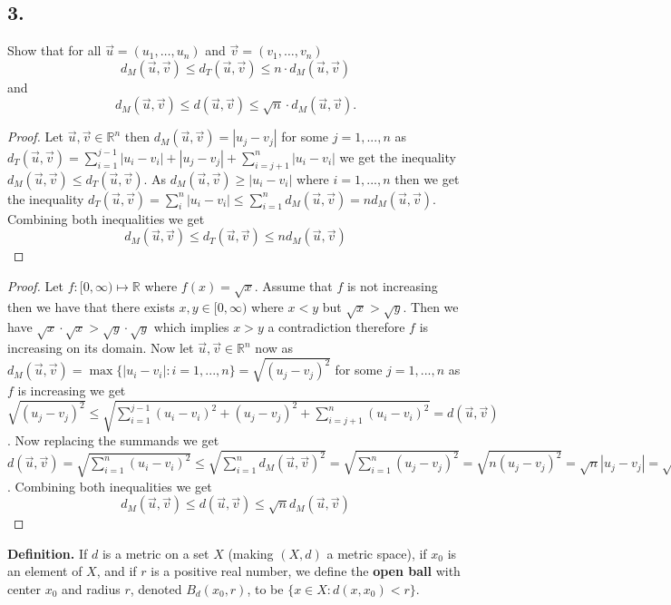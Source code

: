 \documentclass{amsart}
\theoremstyle{plain}
\theoremstyle{definition}
\theoremstyle{remark}
\begin{document}
\noindent
\subsection*{3.}  Show that for all $\vec{u} = (u_1, \ldots , u_n)$ and $\vec{v} = (v_1, \ldots , v_n )$
\[
    d_M (\vec{u} , \vec{v} ) \le d_T (\vec{u} , \vec{v} ) \le n\cdot d_M (\vec{u} , \vec{v} )
\]
and
\[
    d_M (\vec{u} , \vec{v} ) \le d (\vec{u} , \vec{v} ) \le \sqrt{n}\cdot d_M (\vec{u} , \vec{v} ).
\]

\vspace{.15in}


\begin{proof}

    Let $\vec{u},\vec{v}\in \mathbb{R}^n$ then $d_M(\vec{u},\vec{v})=|u_j-v_j|$ for some $j=1,...,n$ as $d_T(\vec{u},\vec{v})=\sum_{i=1}^{j-1}|u_i-v_i|+|u_j-v_j|+\sum_{i=j+1}^{n}|u_i-v_i|$ we get the inequality $d_M(\vec{u},\vec{v})\leq d_T(\vec{u},\vec{v})$. As $d_M(\vec{u},\vec{v})\geq |u_i-v_i|$ where $i=1,...,n$ then we get the inequality $d_T(\vec{u},\vec{v})=\sum_{i}^{n}|u_i-v_i|\leq \sum_{i=1}^{n}d_M(\vec{u},\vec{v})=nd_M(\vec{u},\vec{v})$.
    Combining both inequalities we get $$d_M(\vec{u},\vec{v})\leq d_T(\vec{u},\vec{v})\leq nd_M(\vec{u},\vec{v})$$
\end{proof}

\begin{proof}
    Let $f:[0,\infty)\mapsto \mathbb{R}$ where $f(x)=\sqrt{x}$. Assume that $f$ is not increasing then we have that there exists $x,y\in [0,\infty)$ where $x<y$ but $\sqrt{x}>\sqrt{y}$. Then we have $\sqrt{x}\cdot \sqrt{x}> \sqrt{y}\cdot \sqrt{y}$ which implies $x>y$ a contradiction therefore $f$ is increasing on its domain. Now let $\vec{u},\vec{v}\in \mathbb{R}^n$ now as $d_M(\vec{u},\vec{v})=\max\{|u_i-v_i|:i=1,...,n\}=\sqrt{(u_j-v_j)^2}$ for some $j=1,...,n$ as $f$ is increasing we get $\sqrt{(u_j-v_j)^2}\leq \sqrt{\sum_{i=1}^{j-1}(u_i-v_i)^2+(u_j-v_j)^2+\sum_{i=j+1}^{n}(u_i-v_i)^2}=d(\vec{u},\vec{v})$. Now replacing the summands we get $d(\vec{u},\vec{v})=\sqrt{\sum_{i=1}^{n}(u_i-v_i)^2}\leq \sqrt{\sum_{i=1}^{n}d_M(\vec{u},\vec{v})^2}=\sqrt{\sum_{i=1}^{n}(u_j-v_j)^2}=\sqrt{n(u_j-v_j)^2}=\sqrt{n}|u_j-v_j|=\sqrt{n}d_M(\vec{u},\vec{v})$. Combining both inequalities we get $$d_M(\vec{u},\vec{v})\leq d(\vec{u},\vec{v})\leq \sqrt{n}d_M(\vec{u},\vec{v})$$
\end{proof}



\noindent
{\bfseries Definition.} If $d$ is a metric on a set $X$ (making $(X,d)$ a metric space), if $x_0$ is an element of $X$, and if $r$ is a positive real number, we define the {\bfseries open ball} with center $x_0$ and radius $r$, denoted $B_d(x_0, r)$, to be $\{ x\in X : d(x, x_0) < r\}$.
\end{document}
